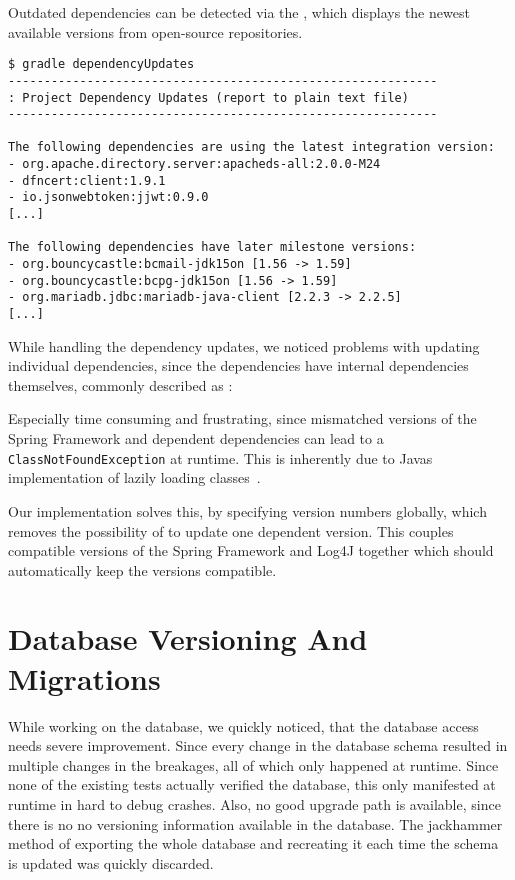 Outdated dependencies can be detected via the , which displays the newest available versions
from open-source repositories.

\begin{lstlisting}
$ gradle dependencyUpdates
------------------------------------------------------------
: Project Dependency Updates (report to plain text file)
------------------------------------------------------------

The following dependencies are using the latest integration version:
- org.apache.directory.server:apacheds-all:2.0.0-M24
- dfncert:client:1.9.1
- io.jsonwebtoken:jjwt:0.9.0
[...]

The following dependencies have later milestone versions:
- org.bouncycastle:bcmail-jdk15on [1.56 -> 1.59]
- org.bouncycastle:bcpg-jdk15on [1.56 -> 1.59]
- org.mariadb.jdbc:mariadb-java-client [2.2.3 -> 2.2.5]
[...]
\end{lstlisting}


While handling the dependency updates, we noticed problems with updating individual dependencies, since the dependencies
have internal dependencies themselves, commonly described as : %

Especially time consuming and frustrating, since mismatched versions of the Spring Framework and dependent dependencies
can lead to a \lstinline{ClassNotFoundException} at runtime.
This is inherently due to Javas implementation of lazily loading classes~\cite{gosling2014java}.

Our implementation solves this, by specifying version numbers globally, which removes the possibility of  to
update one dependent version.
This couples compatible versions of the Spring Framework and Log4J together which should automatically keep the versions
compatible.

\section{Database Versioning And Migrations}\label{sec:databaseVersioningAndMigrations}
While working on the database, we quickly noticed, that the database access needs severe improvement.
Since every change in the database schema resulted in multiple changes in the breakages, all of which only happened at
runtime.
Since none of the existing tests actually verified the database, this only manifested at runtime in hard to debug
crashes.
Also, no good upgrade path is available, since there is no no versioning information available in the database.
The jackhammer method of exporting the whole database and recreating it each time the schema is updated was quickly
discarded.

